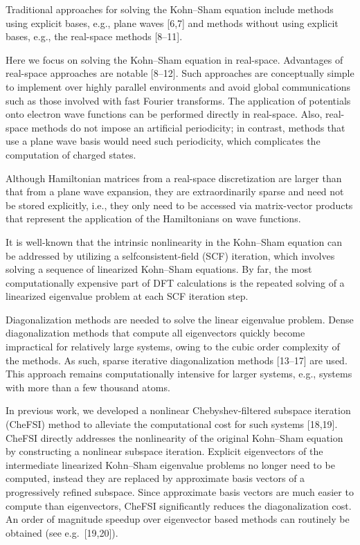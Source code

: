 \documentclass[
  10
]{article}
\begin{document}
Traditional approaches for solving the Kohn--Sham equation include
methods using explicit bases, e.g., plane waves {[}6,7{]} and methods
without using explicit bases, e.g., the real-space methods {[}8--11{]}.

Here we focus on solving the Kohn--Sham equation in real-space.
Advantages of real-space approaches are notable {[}8--12{]}. Such
approaches are conceptually simple to implement over highly parallel
environments and avoid global communications such as those involved with
fast Fourier transforms. The application of potentials onto electron
wave functions can be performed directly in real-space. Also, real-space
methods do not impose an artificial periodicity; in contrast, methods
that use a plane wave basis would need such periodicity, which
complicates the computation of charged states.

Although Hamiltonian matrices from a real-space discretization are
larger than that from a plane wave expansion, they are extraordinarily
sparse and need not be stored explicitly, i.e., they only need to be
accessed via matrix-vector products that represent the application of
the Hamiltonians on wave functions.

It is well-known that the intrinsic nonlinearity in the Kohn--Sham
equation can be addressed by utilizing a selfconsistent-field (SCF)
iteration, which involves solving a sequence of linearized Kohn--Sham
equations. By far, the most computationally expensive part of DFT
calculations is the repeated solving of a linearized eigenvalue problem
at each SCF iteration step.

Diagonalization methods are needed to solve the linear eigenvalue
problem. Dense diagonalization methods that compute all eigenvectors
quickly become impractical for relatively large systems, owing to the
cubic order complexity of the methods. As such, sparse iterative
diagonalization methods {[}13--17{]} are used. This approach remains
computationally intensive for larger systems, e.g., systems with more
than a few thousand atoms.

In previous work, we developed a nonlinear Chebyshev-filtered subspace
iteration (CheFSI) method to alleviate the computational cost for such
systems {[}18,19{]}. CheFSI directly addresses the nonlinearity of the
original Kohn--Sham equation by constructing a nonlinear subspace
iteration. Explicit eigenvectors of the intermediate linearized
Kohn--Sham eigenvalue problems no longer need to be computed, instead
they are replaced by approximate basis vectors of a progressively
refined subspace. Since approximate basis vectors are much easier to
compute than eigenvectors, CheFSI significantly reduces the
diagonalization cost. An order of magnitude speedup over eigenvector
based methods can routinely be obtained (see e.g.~{[}19,20{]}).
\end{document}
